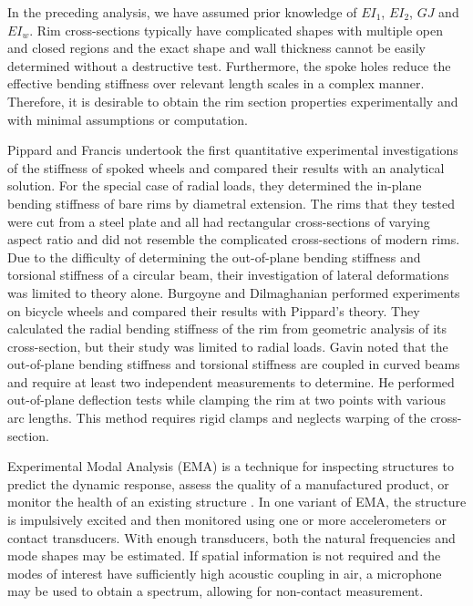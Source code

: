 \documentclass[../thesis.tex]{subfiles}
\begin{document}
In the preceding analysis, we have assumed prior knowledge of $EI_1$, $EI_2$, $GJ$ and $EI_w$. Rim cross-sections typically have complicated shapes with multiple open and closed regions and the exact shape and wall thickness cannot be easily determined without a destructive test. Furthermore, the spoke holes reduce the effective bending stiffness over relevant length scales in a complex manner. Therefore, it is desirable to obtain the rim section properties experimentally and with minimal assumptions or computation.

Pippard and Francis \cite{Pippard1931b,Pippard1932d} undertook the first quantitative experimental investigations of the stiffness of spoked wheels and compared their results with an analytical solution. For the special case of radial loads, they determined the in-plane bending stiffness of bare rims by diametral extension. The rims that they tested were cut from a steel plate and all had rectangular cross-sections of varying aspect ratio and did not resemble the complicated cross-sections of modern rims. Due to the difficulty of determining the out-of-plane bending stiffness and torsional stiffness of a circular beam, their investigation of lateral deformations was limited to theory alone. Burgoyne and Dilmaghanian \cite{Burgoyne1993b} performed experiments on bicycle wheels and compared their results with Pippard's theory. They calculated the radial bending stiffness of the rim from geometric analysis of its cross-section, but their study was limited to radial loads. Gavin \cite{Gavin1996b} noted that the out-of-plane bending stiffness and torsional stiffness are coupled in curved beams and require at least two independent measurements to determine. He performed out-of-plane deflection tests while clamping the rim at two points with various arc lengths. This method requires rigid clamps and neglects warping of the cross-section.

Experimental Modal Analysis (EMA) \cite{Ewins1984} is a technique for inspecting structures to predict the dynamic response, assess the quality of a manufactured product, or monitor the health of an existing structure \cite{Salawu1997}. In one variant of EMA, the structure is impulsively excited and then monitored using one or more accelerometers or contact transducers. With enough transducers, both the natural frequencies and mode shapes may be estimated. If spatial information is not required and the modes of interest have sufficiently high acoustic coupling in air, a microphone may be used to obtain a spectrum, allowing for non-contact measurement.
\end{document}
